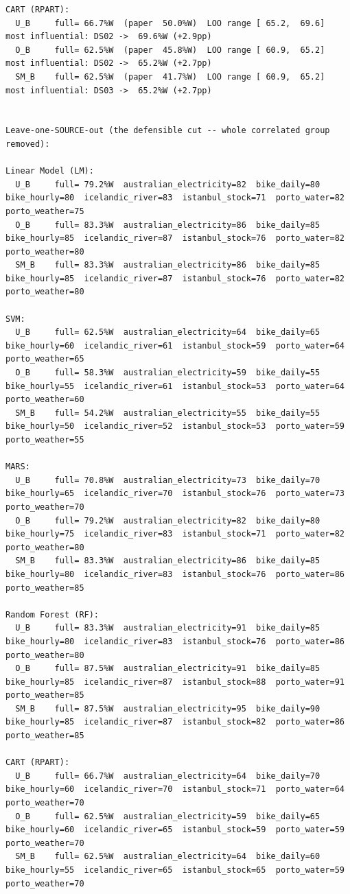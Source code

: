 \begin{verbatim}
CART (RPART):
  U_B     full= 66.7%W  (paper  50.0%W)  LOO range [ 65.2,  69.6]  most influential: DS02 ->  69.6%W (+2.9pp)
  O_B     full= 62.5%W  (paper  45.8%W)  LOO range [ 60.9,  65.2]  most influential: DS02 ->  65.2%W (+2.7pp)
  SM_B    full= 62.5%W  (paper  41.7%W)  LOO range [ 60.9,  65.2]  most influential: DS03 ->  65.2%W (+2.7pp)


Leave-one-SOURCE-out (the defensible cut -- whole correlated group removed):

Linear Model (LM):
  U_B     full= 79.2%W  australian_electricity=82  bike_daily=80  bike_hourly=80  icelandic_river=83  istanbul_stock=71  porto_water=82  porto_weather=75
  O_B     full= 83.3%W  australian_electricity=86  bike_daily=85  bike_hourly=85  icelandic_river=87  istanbul_stock=76  porto_water=82  porto_weather=80
  SM_B    full= 83.3%W  australian_electricity=86  bike_daily=85  bike_hourly=85  icelandic_river=87  istanbul_stock=76  porto_water=82  porto_weather=80

SVM:
  U_B     full= 62.5%W  australian_electricity=64  bike_daily=65  bike_hourly=60  icelandic_river=61  istanbul_stock=59  porto_water=64  porto_weather=65
  O_B     full= 58.3%W  australian_electricity=59  bike_daily=55  bike_hourly=55  icelandic_river=61  istanbul_stock=53  porto_water=64  porto_weather=60
  SM_B    full= 54.2%W  australian_electricity=55  bike_daily=55  bike_hourly=50  icelandic_river=52  istanbul_stock=53  porto_water=59  porto_weather=55

MARS:
  U_B     full= 70.8%W  australian_electricity=73  bike_daily=70  bike_hourly=65  icelandic_river=70  istanbul_stock=76  porto_water=73  porto_weather=70
  O_B     full= 79.2%W  australian_electricity=82  bike_daily=80  bike_hourly=75  icelandic_river=83  istanbul_stock=71  porto_water=82  porto_weather=80
  SM_B    full= 83.3%W  australian_electricity=86  bike_daily=85  bike_hourly=80  icelandic_river=83  istanbul_stock=76  porto_water=86  porto_weather=85

Random Forest (RF):
  U_B     full= 83.3%W  australian_electricity=91  bike_daily=85  bike_hourly=80  icelandic_river=83  istanbul_stock=76  porto_water=86  porto_weather=80
  O_B     full= 87.5%W  australian_electricity=91  bike_daily=85  bike_hourly=85  icelandic_river=87  istanbul_stock=88  porto_water=91  porto_weather=85
  SM_B    full= 87.5%W  australian_electricity=95  bike_daily=90  bike_hourly=85  icelandic_river=87  istanbul_stock=82  porto_water=86  porto_weather=85

CART (RPART):
  U_B     full= 66.7%W  australian_electricity=64  bike_daily=70  bike_hourly=60  icelandic_river=70  istanbul_stock=71  porto_water=64  porto_weather=70
  O_B     full= 62.5%W  australian_electricity=59  bike_daily=65  bike_hourly=60  icelandic_river=65  istanbul_stock=59  porto_water=59  porto_weather=70
  SM_B    full= 62.5%W  australian_electricity=64  bike_daily=60  bike_hourly=55  icelandic_river=65  istanbul_stock=65  porto_water=59  porto_weather=70



\end{verbatim}
